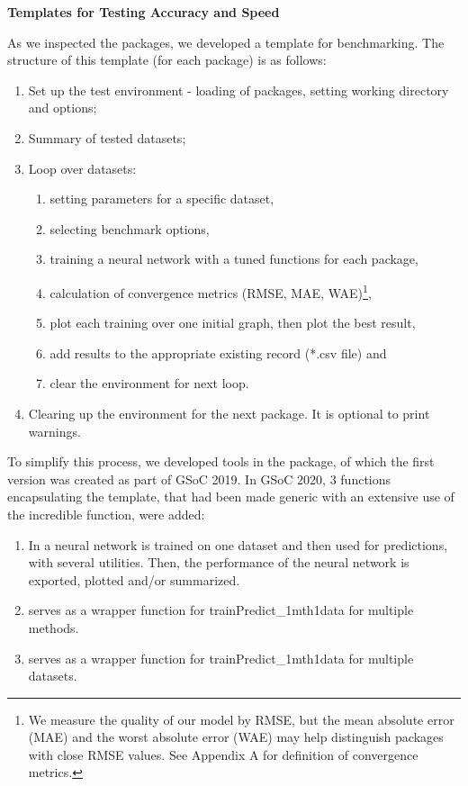 \textbf{Templates for Testing Accuracy and Speed}

As we inspected the packages, we developed a template for benchmarking.
The structure of this template (for each package) is as follows:

\begin{enumerate}
\def\labelenumi{\arabic{enumi}.}
\tightlist
\item
  Set up the test environment - loading of packages, setting working
  directory and options;
\item
  Summary of tested datasets;
\item
  Loop over datasets:

  \begin{enumerate}
  \def\labelenumii{\alph{enumii}.}
  \tightlist
  \item
    setting parameters for a specific dataset,
  \item
    selecting benchmark options,
  \item
    training a neural network with a tuned functions for each package,
  \item
    calculation of convergence metrics (RMSE, MAE, WAE)\footnote{We
      measure the quality of our model by RMSE, but the mean absolute
      error (MAE) and the worst absolute error (WAE) may help
      distinguish packages with close RMSE values. See Appendix A for
      definition of convergence metrics.},
  \item
    plot each training over one initial graph, then plot the best
    result,
  \item
    add results to the appropriate existing record (*.csv file) and
  \item
    clear the environment for next loop.
  \end{enumerate}
\item
  Clearing up the environment for the next package. It is optional to
  print warnings.
\end{enumerate}

To simplify this process, we developed tools in the 
package, of which the first version was created as part of GSoC 2019. In
GSoC 2020, 3 functions encapsulating the template, that had been made
generic with an extensive use of the incredible  function,
were added:

\begin{enumerate}
\def\labelenumi{\arabic{enumi}.}
\tightlist
\item
  In  a neural network is trained on one
  dataset and then used for predictions, with several utilities. Then,
  the performance of the neural network is exported, plotted and/or
  summarized.
\item
   serves as a wrapper function for
  trainPredict\_1mth1data for multiple methods.
\item
   serves as a wrapper function for
  trainPredict\_1mth1data for multiple datasets.
\end{enumerate}

